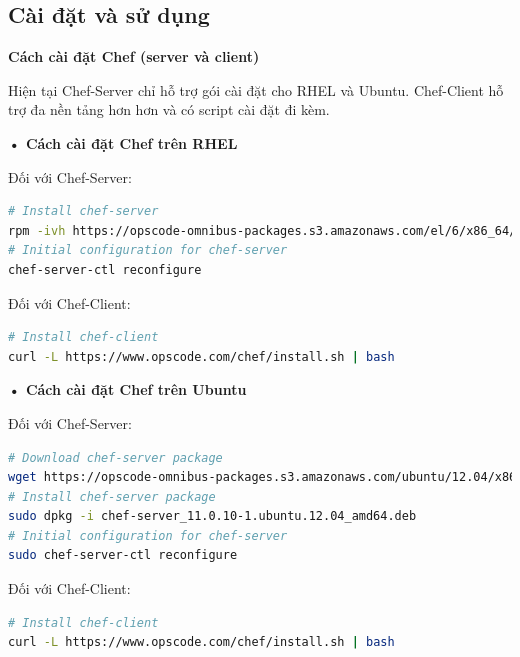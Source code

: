 \newpage
\clearpage

\subsection{Cài đặt và sử dụng}

\textbf{\large Cách cài đặt Chef (server và client)}

Hiện tại Chef-Server chỉ hỗ trợ gói cài đặt cho RHEL và Ubuntu. Chef-Client hỗ trợ đa nền tảng hơn hơn và có script cài đặt đi kèm.

\textbf{• Cách cài đặt Chef trên RHEL}

Đối với Chef-Server:

\begin{lstlisting}[label={lst:chef_install_server_rhel},caption={Cách cài đặt chef-server trên RHEL},language=bash]
# Install chef-server
rpm -ivh https://opscode-omnibus-packages.s3.amazonaws.com/el/6/x86_64/chef-server-11.0.10-1.el6.x86_64.rpm
# Initial configuration for chef-server
chef-server-ctl reconfigure
\end{lstlisting}

Đối với Chef-Client:

\begin{lstlisting}[label={lst:chef_install_client_rhel},caption={Cách cài đặt chef-client trên RHEL},language=bash]
# Install chef-client
curl -L https://www.opscode.com/chef/install.sh | bash
\end{lstlisting}

\textbf{• Cách cài đặt Chef trên Ubuntu}

Đối với Chef-Server:

\begin{lstlisting}[label={lst:chef_install_server_ubuntu},caption={Cách cài đặt chef-server trên Ubuntu},language=bash]
# Download chef-server package
wget https://opscode-omnibus-packages.s3.amazonaws.com/ubuntu/12.04/x86_64/chef-server_11.0.10-1.ubuntu.12.04_amd64.deb
# Install chef-server package
sudo dpkg -i chef-server_11.0.10-1.ubuntu.12.04_amd64.deb
# Initial configuration for chef-server
sudo chef-server-ctl reconfigure
\end{lstlisting}

\newpage
\clearpage

Đối với Chef-Client:

\begin{lstlisting}[label={lst:chef_install_client_ubuntu},caption={Cách cài đặt chef-client trên Ubuntu},language=bash]
# Install chef-client
curl -L https://www.opscode.com/chef/install.sh | bash
\end{lstlisting}

